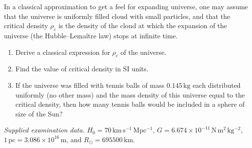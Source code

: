 In a classical approximation to get a feel for expanding universe, one may assume that the universe is uniformly filled cloud with small particles, and that the critical density $\rho_c$ is the density of the cloud at which the expansion of the universe (the Hubble--Lema\^itre law) stops at infinite time.
\begin{enumerate}
\item Derive a classical expression for $\rho_c$ of the universe.
\item Find the value of critical density in SI units.
\item If the universe was filled with tennis balls of mass $0.145\,\mathrm{kg}$ each distributed uniformly (no other mass) and the mass density of this universe equal to the critical density, then how many tennis balls would be included in a sphere of size of the Sun?
\end{enumerate}
\textit{Supplied examination data.} $H_0=70\,\mathrm{km\,s^{-1}\,Mpc^{-1}}$, $G=6.674\times10^{-11}\,\mathrm{N\,m^2\,kg^{-2}}$, $1\,\mathrm{pc}=3.086\times10^{16}\,\mathrm{m}$, and $R_\odot=695500\,\mathrm{km}$.
